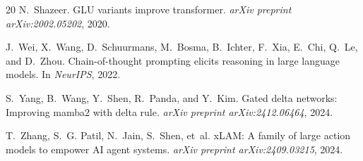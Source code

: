 \documentclass[10pt,twocolumn]{article}
\begin{document}
\begin{thebibliography}{20}
N.~Shazeer.
\newblock GLU variants improve transformer.
\newblock \emph{arXiv preprint arXiv:2002.05202}, 2020.

J.~Wei, X.~Wang, D.~Schuurmans, M.~Bosma, B.~Ichter, F.~Xia, E.~Chi, Q.~Le, and D.~Zhou.
\newblock Chain-of-thought prompting elicits reasoning in large language models.
\newblock In \emph{NeurIPS}, 2022.

S.~Yang, B.~Wang, Y.~Shen, R.~Panda, and Y.~Kim.
\newblock Gated delta networks: Improving mamba2 with delta rule.
\newblock \emph{arXiv preprint arXiv:2412.06464}, 2024.

T.~Zhang, S.~G. Patil, N.~Jain, S.~Shen, et~al.
\newblock xLAM: A family of large action models to empower AI agent systems.
\newblock \emph{arXiv preprint arXiv:2409.03215}, 2024.

\end{thebibliography}
\end{document}
